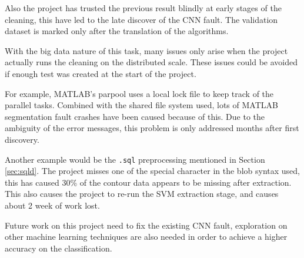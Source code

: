 \documentclass[bsc,logo,twoside,fullspacing,parskip]{infthesis}
\begin{document}
Also the project has trusted the previous result blindly at early stages of the cleaning, this have led to the late discover of the CNN fault.
The validation dataset is marked only after the translation of the algorithms.

With the big data nature of this task, many issues only arise when the project actually runs the cleaning on the distributed scale.
These issues could be avoided if enough test was created at the start of the project.

For example, MATLAB's parpool uses a local lock file to keep track of the parallel tasks. 
Combined with the shared file system used, lots of MATLAB segmentation fault crashes have been caused because of this. 
Due to the ambiguity of the error messages, this problem is only addressed months after first discovery.

Another example would be the {\tt .sql} preprocessing mentioned in Section \ref{sec:sqld}.
The project misses one of the special character in the blob syntax used, this has caused 30\% of the contour data appears to be missing after extraction.
This also causes the project to re-run the SVM extraction stage, and causes about 2 week of work lost.

Future work on this project need to fix the existing CNN fault, exploration on other machine learning techniques are also needed in order to achieve a higher accuracy on the classification. 







\end{document}
